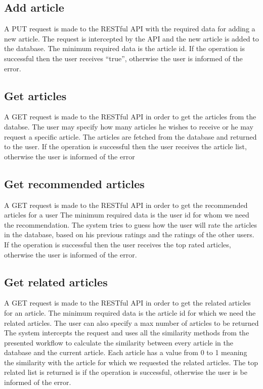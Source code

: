 \subsection{Add article}
\label{sec:workflow-add-article}
A PUT request is made to the RESTful API with the required data for adding a new article.
The request is intercepted by the API and the new article is added to the database.
The minimum required data is the article id.
If the operation is successful then the user receives “true”, otherwise the user is informed of the error.


\subsection{Get articles}
\label{sec:workflow-get-all-articles}
A GET request is made to the RESTful API in order to get the articles from the databse.
The user may specify how many articles he wishes to receive or he may request a specific article.
The articles are fetched from the database and returned to the user.
If the operation is successful then the user receives the article list, otherwise the user is informed of the error

\subsection{Get recommended articles}
\label{sec:workflow-get-recommended-articles}
A GET request is made to the RESTful API in order to get the recommended articles for a user
The minimum required data is the user id for whom we need the recommendation.
The system tries to guess how the user will rate the articles in the database, based on his previous ratings and the ratings of the other users.
If the operation is successful then the user receives the top rated articles, otherwise the user is informed of the error.

\subsection{Get related articles}
\label{sec:workflow-get-related-articles}
A GET request is made to the RESTful API in order to get the related articles for an article.
The minimum required data is the article id for which we need the related articles. The user can also specify a max number of articles to be returned
The system intercepts the request and uses all the similarity methods from the presented workflow to calculate the similarity between every article in the database and the current article.
Each article has a value from 0 to 1 meaning the similarity with the article for which we requested the related articles.
The top related list is returned is if the operation is successful, otherwise the user is be informed of the error.



